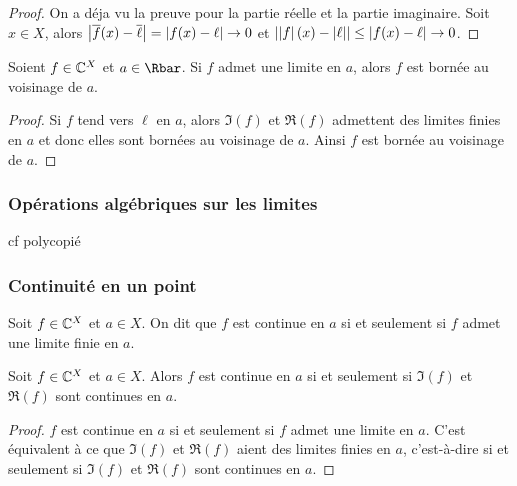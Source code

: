 \begin{proof}
  On a déja vu la preuve pour la partie réelle et la partie imaginaire. Soit $x \in X$, alors $\left\lvert\overline{f}(x)-\overline{\ell}\right\rvert = \left\lvert f(x)-\ell\right\rvert \rightarrow 0$ et $\left\lvert\left\lvert f\right\rvert(x)-\left\lvert\ell\right\rvert\right\rvert \leq \left\lvert f(x)-\ell\right\rvert \rightarrow 0$.
\end{proof}
\begin{prop}
  Soient $f \in \mathbb{C}^X$ et $a \in \Rbar$. Si $f$ admet une limite en $a$, alors $f$ est bornée au voisinage de $a$.
\end{prop}
\begin{proof}
  Si $f$ tend vers $\ell$ en $a$, alors $\Im(f)$ et $\Re(f)$ admettent des limites finies en $a$ et donc elles sont bornées au voisinage de $a$. Ainsi $f$ est bornée au voisinage de $a$.
\end{proof}
\subsubsection{Opérations algébriques sur les limites}
cf polycopié
\subsubsection{Continuité en un point}
\begin{defdef}
  Soit $f \in \mathbb{C}^X$ et $a \in X$. On dit que $f$ est continue en $a$ si et seulement si $f$ admet une limite finie en $a$.
\end{defdef}
\begin{prop}
  Soit $f \in \mathbb{C}^X$ et $a \in X$. Alors $f$ est continue en $a$ si et seulement si $\Im(f)$ et $\Re(f)$ sont continues en $a$. 
\end{prop}
\begin{proof}
  $f$ est continue en $a$ si et seulement si $f$ admet une limite en $a$. C'est équivalent à ce que $\Im(f)$ et $\Re(f)$ aient des limites finies en $a$, c'est-à-dire si et seulement si $\Im(f)$ et $\Re(f)$ sont continues en $a$.
\end{proof}

